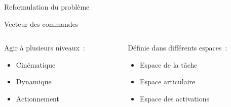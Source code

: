 \begin{frame}{Reformulation du problème}
    \begin{block}{Vecteur des commandes}
        \begin{columns}
            \begin{column}{0.40\textwidth}
                Agir à plusieurs niveaux~:
                \begin{itemize}
                    \item Cinématique
                    \item Dynamique
                    \item Actionnement
                \end{itemize}
            \end{column}
            \begin{column}{0.50\textwidth}
                Définie dans différents espaces~:
                \begin{itemize}
                    \item Espace de la tâche
                    \item Espace articulaire
                    \item Espace des activations
                \end{itemize}
            \end{column}
        \end{columns}
        \begin{figure}
            \centering
            ~~
        \end{figure}
    \end{block}
\end{frame}

